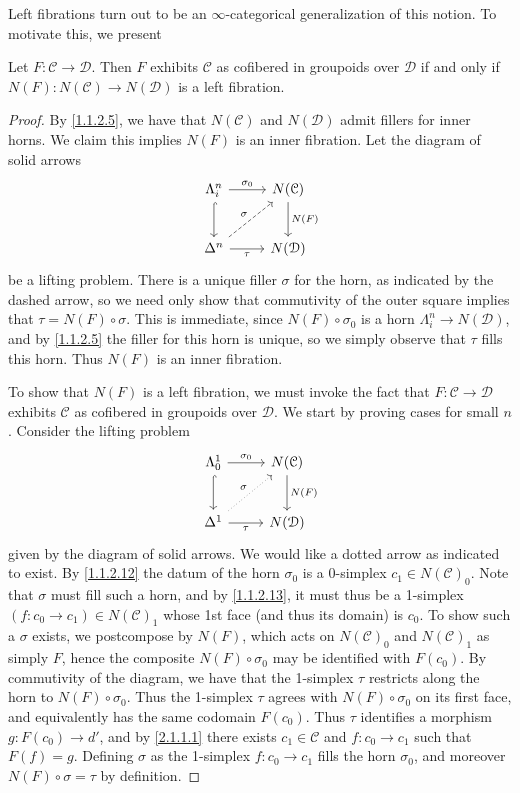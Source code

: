 Left fibrations turn out to be an $\infty $-categorical generalization of this notion. To motivate this, we present
\begin{proposition}\label{2.1.1.3}
	Let $F : \mathcal{C}  \to \mathcal{D} $. Then $F$ exhibits $\mathcal{C} $ as cofibered in groupoids over $\mathcal{D} $ if and only if $N(F): N(\mathcal{C} ) \to N(\mathcal{D} )$ is a left fibration.
\end{proposition}
\begin{proof}
	By \cref{1.1.2.5}, we have that $N(\mathcal{C} )$ and $N(\mathcal{D} )$ admit fillers for inner horns. We claim this implies $N(F)$ is an inner fibration. Let the diagram of solid arrows
	\[\begin{tikzcd}[row sep = 2.5em, column sep = 2.5em]
	\Lambda _i^n \ar[" \sigma _0 ", r] \ar[hook, d]  & N(\mathcal{C} )\ar[" N(F) ", d]  \\
	\Delta ^n \ar[" \tau  "', r]\ar[" \sigma  ", dashed, ur]   & N(\mathcal{D} )
	\end{tikzcd}\]
	be a lifting problem. There is a unique filler $\sigma $ for the horn, as indicated by the dashed arrow, so we need only show that commutivity of the outer square implies that $\tau =N(F)\circ \sigma $. This is immediate, since $N(F)\circ \sigma _0$ is a horn $\Lambda _i^n\to N(\mathcal{D} )$, and by \cref{1.1.2.5} the filler for this horn is unique, so we simply observe that $\tau $ fills this horn. Thus $N(F)$ is an inner fibration.

	To show that $N(F)$ is a left fibration, we must invoke the fact that $F : \mathcal{C}  \to \mathcal{D} $ exhibits $\mathcal{C} $ as cofibered in groupoids over $\mathcal{D} $. We start by proving cases for small $n$. Consider the lifting problem
	\[\begin{tikzcd}[row sep = 2.5em, column sep = 2.5em]
	\Lambda _0^1 \ar[" \sigma _0 ", r] \ar[hook, d]  & N(\mathcal{C} )\ar[" N(F)", d]  \\
	\Delta ^1 \ar[" \tau  "', r] \ar[dotted, " \sigma  ", ur]  & N(\mathcal{D} )
	\end{tikzcd}\]
	given by the diagram of solid arrows. We would like a dotted arrow as indicated to exist. By \cref{1.1.2.12} the datum of the horn $\sigma _0$ is a 0-simplex $c_1\in N(\mathcal{C} )_0$. Note that $\sigma $ must fill such a horn, and by \cref{1.1.2.13}, it must thus be a 1-simplex $(f : c_0 \to c_1)\in N(\mathcal{C} )_1$ whose 1st face (and thus its domain) is $c_0$. To show such a $\sigma $ exists, we postcompose by $N(F)$, which acts on $N(\mathcal{C} )_0$ and $N(\mathcal{C} )_1$ as simply $F$, hence the composite $N(F)\circ \sigma_0$ may be identified with $F(c_0)$. By commutivity of the diagram, we have that the 1-simplex $\tau $ restricts along the horn to $N(F)\circ \sigma _0$. Thus the 1-simplex $\tau $ agrees with $N(F)\circ \sigma _0$ on its first face, and equivalently has the same codomain $F(c_0)$. Thus $\tau $ identifies a morphism $g : F(c_0) \to d'$, and by \cref{2.1.1.1} there exists $c_1\in \mathcal{C} $ and $f : c_0 \to c_1$ such that $F(f)=g$. Defining $\sigma $ as the 1-simplex $f : c_0 \to c_1$ fills the horn $\sigma _0$, and moreover $N(F)\circ \sigma =\tau $ by definition.


\end{proof}
